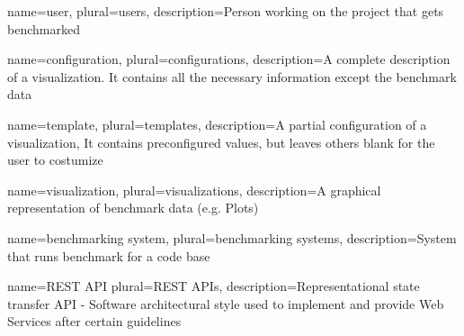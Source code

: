 \makenoidxglossaries

{
	name=user,
	plural=users,
	description={Person working on the project that gets benchmarked}
}

{
	name=configuration,
	plural=configurations,
	description={A complete description of a \gls{visualization}. It contains all the necessary information except the benchmark data}
}

{
	name=template,
	plural=templates,
	description={A partial configuration of a \gls{visualization}, It contains preconfigured values, but leaves others blank for the user to costumize}
}

{
	name=visualization,
	plural=visualizations,
	description={A graphical representation of benchmark data (e.g. Plots)}
}

{
	name=benchmarking system,
	plural=benchmarking systems,
	description={System that runs benchmark for a code base}
}

{
	name=REST API
	plural=REST APIs,
	description={Representational state transfer API - Software architectural style used to implement and provide Web Services after certain guidelines}
}


